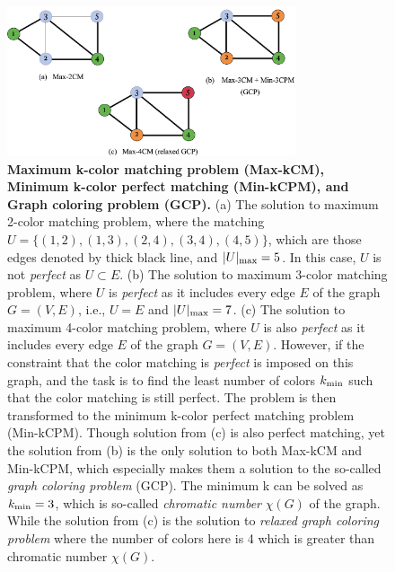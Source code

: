 \documentclass[%
 reprint,
nofootinbib,
 amsmath,amssymb,
 aps,
floatfix,
]{revtex4-2}
\begin{document}
\begin{figure}[ht!]
    \centering
    \includegraphics[width=8.5cm]{picture/color_matching.png}
    \caption{\textbf{Maximum k-color matching problem (Max-kCM), Minimum k-color perfect matching (Min-kCPM), and Graph coloring problem (GCP).} (a) The solution to maximum 2-color matching problem, where the matching $U = \{(1,2),(1,3),(2,4),(3,4),(4,5)\}$, which are those edges denoted by thick black line, and $|U|_{\text{\rm max}}=5$. In this case, $U$ is not \emph{perfect} as $U \subset E$.  (b) The solution to maximum 3-color matching problem, where $U$ is \emph{perfect} as it includes every edge $E$ of the graph $G=(V,E)$, i.e., $U = E$ and $|U|_{\text{\rm max}}=7$. (c) The solution to maximum 4-color matching problem, where $U$ is also \emph{perfect} as it includes every edge $E$ of the graph $G=(V,E)$. However, if the constraint that the color matching is \emph{perfect} is imposed on this graph, and the task is to find the least number of colors $k_{\rm min}$ such that the color matching is still perfect. The problem is then transformed to the minimum k-color perfect matching problem (Min-kCPM). Though solution from (c) is also perfect matching, yet the solution from (b) is the only solution to both Max-kCM and Min-kCPM, which especially makes them a solution to the so-called \emph{graph coloring problem} (GCP). The minimum k can be solved as $k_{\text{\rm min}} = 3$, which is so-called \emph{chromatic number} $\chi(G)$ of the graph. While the solution from (c) is the solution to \emph{relaxed graph coloring problem} where the number of colors here is 4 which is greater than chromatic number $\chi(G)$.} 
    \label{fig:color-matching}
\end{figure}
\end{document}
